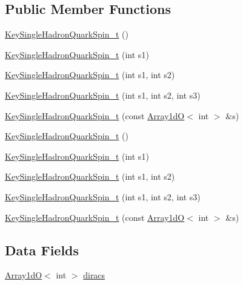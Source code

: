 \subsection*{Public Member Functions}
\begin{DoxyCompactItemize}
\item 
\mbox{\hyperlink{structHadron_1_1KeySingleHadronQuarkSpin__t_a5343b9bcb3637c3cbfd403c1fdcee16a}{Key\+Single\+Hadron\+Quark\+Spin\+\_\+t}} ()
\item 
\mbox{\hyperlink{structHadron_1_1KeySingleHadronQuarkSpin__t_adf80ea1775391ee8eb530185684343aa}{Key\+Single\+Hadron\+Quark\+Spin\+\_\+t}} (int s1)
\item 
\mbox{\hyperlink{structHadron_1_1KeySingleHadronQuarkSpin__t_a649d988b46181870449e3d527bb526e5}{Key\+Single\+Hadron\+Quark\+Spin\+\_\+t}} (int s1, int s2)
\item 
\mbox{\hyperlink{structHadron_1_1KeySingleHadronQuarkSpin__t_afec33cba311846572f37275a069d28af}{Key\+Single\+Hadron\+Quark\+Spin\+\_\+t}} (int s1, int s2, int s3)
\item 
\mbox{\hyperlink{structHadron_1_1KeySingleHadronQuarkSpin__t_afb7c4a9f15434b71a4782713c1e0339f}{Key\+Single\+Hadron\+Quark\+Spin\+\_\+t}} (const \mbox{\hyperlink{classADAT_1_1Array1dO}{Array1dO}}$<$ int $>$ \&s)
\item 
\mbox{\hyperlink{structHadron_1_1KeySingleHadronQuarkSpin__t_a5343b9bcb3637c3cbfd403c1fdcee16a}{Key\+Single\+Hadron\+Quark\+Spin\+\_\+t}} ()
\item 
\mbox{\hyperlink{structHadron_1_1KeySingleHadronQuarkSpin__t_adf80ea1775391ee8eb530185684343aa}{Key\+Single\+Hadron\+Quark\+Spin\+\_\+t}} (int s1)
\item 
\mbox{\hyperlink{structHadron_1_1KeySingleHadronQuarkSpin__t_a649d988b46181870449e3d527bb526e5}{Key\+Single\+Hadron\+Quark\+Spin\+\_\+t}} (int s1, int s2)
\item 
\mbox{\hyperlink{structHadron_1_1KeySingleHadronQuarkSpin__t_afec33cba311846572f37275a069d28af}{Key\+Single\+Hadron\+Quark\+Spin\+\_\+t}} (int s1, int s2, int s3)
\item 
\mbox{\hyperlink{structHadron_1_1KeySingleHadronQuarkSpin__t_afb7c4a9f15434b71a4782713c1e0339f}{Key\+Single\+Hadron\+Quark\+Spin\+\_\+t}} (const \mbox{\hyperlink{classADAT_1_1Array1dO}{Array1dO}}$<$ int $>$ \&s)
\end{DoxyCompactItemize}
\subsection*{Data Fields}
\begin{DoxyCompactItemize}
\item 
\mbox{\hyperlink{classADAT_1_1Array1dO}{Array1dO}}$<$ int $>$ \mbox{\hyperlink{structHadron_1_1KeySingleHadronQuarkSpin__t_ac351a0ae22cfe303f2951feb0261e083}{diracs}}
\end{DoxyCompactItemize}


